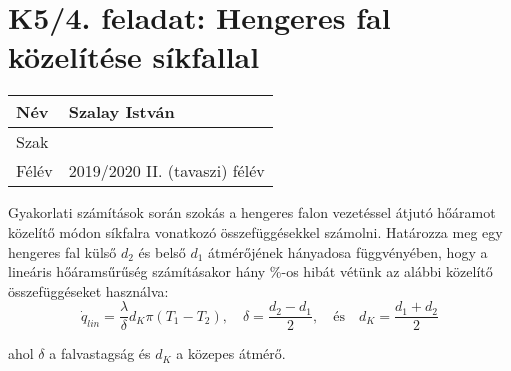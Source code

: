 

\section*{K5/4. feladat: Hengeres fal közelítése síkfallal}

\begin{tabular}{ | p{2cm} | p{14cm} | } 
	\hline
	Név & Szalay István \\ 
	\hline
	Szak & \\ 
	\hline
	Félév & 2019/2020 II. (tavaszi) félév \\ 
	\hline
\end{tabular}
\vspace{0.5cm}

\noindent Gyakorlati számítások során szokás a hengeres falon vezetéssel átjutó hőáramot közelítő módon síkfalra vonatkozó összefüggésekkel számolni. Határozza meg egy hengeres fal külső $d_2$ és belső $d_1$ átmérőjének hányadosa függvényében, hogy a lineáris hőáramsűrűség számításakor hány \%-os hibát vétünk az alábbi közelítő összefüggéseket használva:
\begin{equation}
	\dot{q}_{lin} = \dfrac{\lambda}{\delta} d_K \pi \left(T_1 - T_2\right),
	\quad 
	\delta = \dfrac{d_2 - d_1}{2}, 
	\quad 
	\text{és} 
	\quad d_K = \dfrac{d_1 + d_2}{2}
\end{equation}

ahol $\delta$ a falvastagság és $d_K$ a közepes átmérő.


